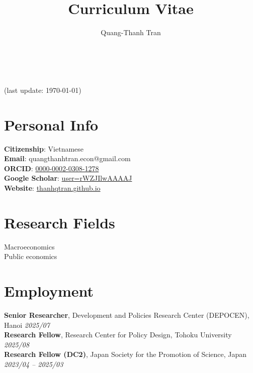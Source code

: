 \documentclass[12pt]{article}
\newcommand{\cvcolor}{\color{DodgerBlue4}} %
\renewcommand{\maketitle}{
\begin{center}
{\Huge\theauthor}\\
\vspace{0.5em}
{\Large \cvcolor{Curriculum Vitae}}\\
{\color{Gray}(last update: \today)}
\end{center}
}
\begin{document}
\title{Curriculum Vitae} %
\author{Quang-Thanh Tran}

\maketitle


\section{Personal Info}
\textbf{Citizenship}: Vietnamese \\
\textbf{Email}: quangthanhtran.econ@gmail.com \\
\textbf{ORCID}: \href{https://orcid.org/0000-0002-0308-1278}{0000-0002-0308-1278}\\
\textbf{Google Scholar}: \href{https://scholar.google.com/citations?user=rWZJIlwAAAAJ&hl=en}{user=rWZJIlwAAAAJ}\\
\textbf{Website}: \href{https://thanhqtran.github.io}{thanhqtran.github.io} \\


\section{Research Fields}
Macroeconomics \\
Public economics


\section{Employment}

\textbf{Senior Researcher}, Development and Policies Research Center (DEPOCEN), Hanoi \hfill \emph{2025/07} \\
\textbf{Research Fellow}, Research Center for Policy Design, Tohoku University \hfill \emph{2025/08} \\
\textbf{Research Fellow (DC2)}, Japan Society for the Promotion of Science, Japan \hfill \emph{2023/04 -- 2025/03}
\end{document}
